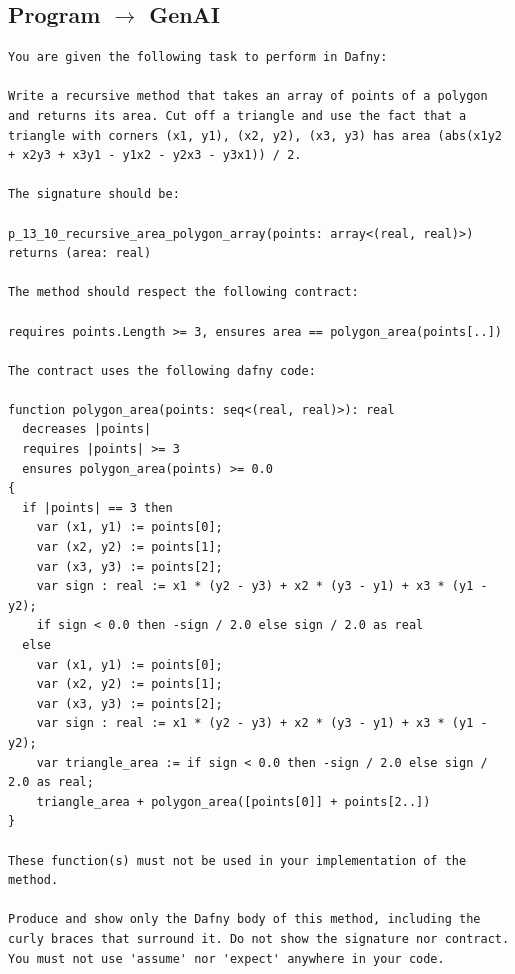 \documentclass{article}
\begin{document}
\subsection*{Program $\rightarrow$ GenAI}
\begin{lstlisting}
You are given the following task to perform in Dafny:

Write a recursive method that takes an array of points of a polygon and returns its area. Cut off a triangle and use the fact that a triangle with corners (x1, y1), (x2, y2), (x3, y3) has area (abs(x1y2 + x2y3 + x3y1 - y1x2 - y2x3 - y3x1)) / 2.

The signature should be:

p_13_10_recursive_area_polygon_array(points: array<(real, real)>) returns (area: real)

The method should respect the following contract:

requires points.Length >= 3, ensures area == polygon_area(points[..])

The contract uses the following dafny code:

function polygon_area(points: seq<(real, real)>): real
  decreases |points|
  requires |points| >= 3
  ensures polygon_area(points) >= 0.0
{
  if |points| == 3 then 
    var (x1, y1) := points[0];
    var (x2, y2) := points[1];
    var (x3, y3) := points[2];
    var sign : real := x1 * (y2 - y3) + x2 * (y3 - y1) + x3 * (y1 - y2);
    if sign < 0.0 then -sign / 2.0 else sign / 2.0 as real 
  else 
    var (x1, y1) := points[0];
    var (x2, y2) := points[1];
    var (x3, y3) := points[2];
    var sign : real := x1 * (y2 - y3) + x2 * (y3 - y1) + x3 * (y1 - y2);
    var triangle_area := if sign < 0.0 then -sign / 2.0 else sign / 2.0 as real;
    triangle_area + polygon_area([points[0]] + points[2..])
}

These function(s) must not be used in your implementation of the method.

Produce and show only the Dafny body of this method, including the curly braces that surround it. Do not show the signature nor contract. You must not use 'assume' nor 'expect' anywhere in your code.
\end{lstlisting}
\end{document}
